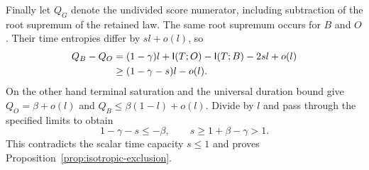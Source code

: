 Finally let $Q_G$ denote the undivided score numerator, including subtraction
of the root supremum of the retained law. The same root supremum occurs for
$B$ and $O$. Their time entropies differ by $sl+o(l)$, so
\begin{align*}
 Q_B-Q_O
 &=(1-\gamma)l+\mathsf I(T;O)-\mathsf I(T;B)-2sl+o(l)\\
 &\geq(1-\gamma-s)l-o(l).
\end{align*}
On the other hand terminal saturation and the universal duration bound give
$Q_O=\beta+o(l)$ and $Q_B\leq\beta(1-l)+o(l)$. Divide by $l$ and pass through
the specified limits to obtain
\[
 1-\gamma-s\leq-\beta,
 \qquad s\geq1+\beta-\gamma>1.
\]
This contradicts the scalar time capacity $s\leq1$ and proves
Proposition~\ref{prop:isotropic-exclusion}.
